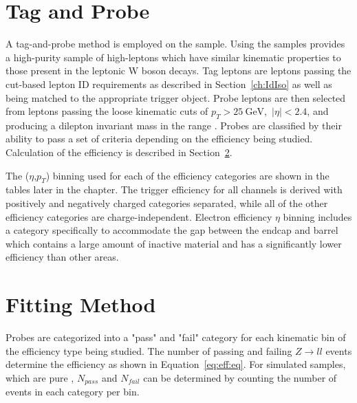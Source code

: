 % 
% 


\section{Tag and Probe}\label{ch:eff:tagandprobe}
A tag-and-probe method is employed on the \zll sample. Using the \zll samples provides a high-purity sample of high-\pt leptons which have similar kinematic properties to those present in the leptonic W boson decays. Tag leptons are leptons passing the cut-based lepton ID requirements as described in Section~\ref{ch:IdIso} as well as being matched to the appropriate trigger object. Probe leptons are then selected from leptons passing the loose kinematic cuts of $p_T > 25 \mathrm{~GeV}$,~$|\eta|<2.4$, and producing a dilepton invariant mass in the range \masswindow. Probes are classified by their ability to pass a set of criteria depending on the efficiency being studied. Calculation of the efficiency is described in Section~\ref{ch:eff:fitting}.

The ($\eta$,$p_T$) binning used for each of the efficiency categories are shown in the tables later in the chapter. The trigger efficiency for all channels is derived with positively and negatively charged categories separated, while all of the other efficiency categories are charge-independent. Electron efficiency $\eta$ binning includes a category specifically to accommodate the gap between the endcap and barrel which contains a large amount of inactive material and has a significantly lower efficiency than other areas.




\section{Fitting Method}\label{ch:eff:fitting}
Probes are categorized into a "pass" and "fail" category for each kinematic bin of the efficiency type being studied. The number of passing and failing $Z\rightarrow ll$ events determine the efficiency as shown in Equation~\ref{eq:eff:eq}. For simulated samples, which are pure \zll, $N_{pass}$ and $N_{fail}$ can be determined by counting the number of events in each category per bin. 

